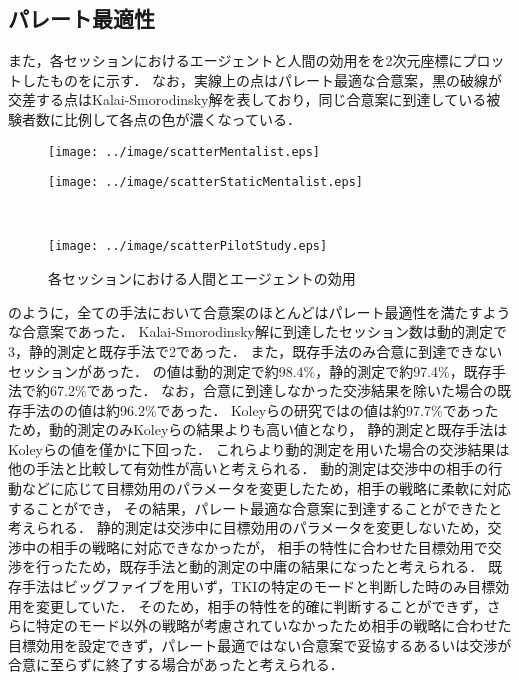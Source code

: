\subsection{パレート最適性}
また，各セッションにおけるエージェントと人間の効用をを2次元座標にプロットしたものをに示す．
なお，実線上の点はパレート最適な合意案，黒の破線が交差する点はKalai-Smorodinsky解を表しており，同じ合意案に到達している被験者数に比例して各点の色が濃くなっている．

\begin{figure}[!bt]
    \begin{minipage}[b]{0.47\linewidth}
        \centering
        \texttt{[image: ../image/scatterMentalist.eps]}
        \label{fig:scatterMentalist}
    \end{minipage}
    \begin{minipage}[b]{0.47\linewidth}
        \centering
        \texttt{[image: ../image/scatterStaticMentalist.eps]}
        \label{fig:scatterStaticMentalist}
    \end{minipage}\\
    \begin{center}
        \begin{minipage}[b]{0.47\linewidth}
            \centering
            \texttt{[image: ../image/scatterPilotStudy.eps]}
            \label{fig:scatterPilotStudy}
        \end{minipage}
    \end{center}
    \caption{各セッションにおける人間とエージェントの効用}\label{fig:scatter}
\end{figure}

のように，全ての手法において合意案のほとんどはパレート最適性を満たすような合意案であった．
Kalai-Smorodinsky解に到達したセッション数は動的測定で3，静的測定と既存手法で2であった．
また，既存手法のみ合意に到達できないセッションがあった．
の値は動的測定で約98.4\%，静的測定で約97.4\%，既存手法で約67.2\%であった．
なお，合意に到達しなかった交渉結果を除いた場合の既存手法のの値は約96.2\%であった．
Koleyらの研究ではの値は約97.7\%であったため，動的測定のみKoleyらの結果よりも高い値となり，
静的測定と既存手法はKoleyらの値を僅かに下回った．
これらより動的測定を用いた場合の交渉結果は他の手法と比較して有効性が高いと考えられる．
動的測定は交渉中の相手の行動などに応じて目標効用のパラメータを変更したため，相手の戦略に柔軟に対応することができ，
その結果，パレート最適な合意案に到達することができたと考えられる．
静的測定は交渉中に目標効用のパラメータを変更しないため，交渉中の相手の戦略に対応できなかったが，
相手の特性に合わせた目標効用で交渉を行ったため，既存手法と動的測定の中庸の結果になったと考えられる．
既存手法はビッグファイブを用いず，TKIの特定のモードと判断した時のみ目標効用を変更していた．
そのため，相手の特性を的確に判断することができず，さらに特定のモード以外の戦略が考慮されていなかったため相手の戦略に合わせた
目標効用を設定できず，パレート最適ではない合意案で妥協するあるいは交渉が合意に至らずに終了する場合があったと考えられる．

